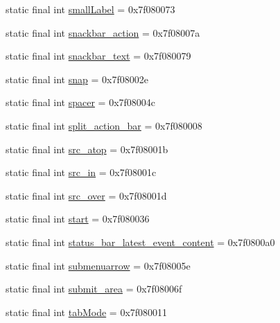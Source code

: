 \begin{CompactItemize}
static final int \hyperlink{classandroid_1_1support_1_1v7_1_1recyclerview_1_1_r_1_1id_5b68944cbbbb99897b27204bfdae8312}{smallLabel} = 0x7f080073
\item 
static final int \hyperlink{classandroid_1_1support_1_1v7_1_1recyclerview_1_1_r_1_1id_1795eacf7b79166ea8f7920e7458a59d}{snackbar\_\-action} = 0x7f08007a
\item 
static final int \hyperlink{classandroid_1_1support_1_1v7_1_1recyclerview_1_1_r_1_1id_b867545d3c71b127e8a68a0974a41d9f}{snackbar\_\-text} = 0x7f080079
\item 
static final int \hyperlink{classandroid_1_1support_1_1v7_1_1recyclerview_1_1_r_1_1id_988340680aebcf90a5486cfcf55a210f}{snap} = 0x7f08002e
\item 
static final int \hyperlink{classandroid_1_1support_1_1v7_1_1recyclerview_1_1_r_1_1id_800f0ac17a6874da8f870f934699b2d8}{spacer} = 0x7f08004c
\item 
static final int \hyperlink{classandroid_1_1support_1_1v7_1_1recyclerview_1_1_r_1_1id_e259a1c9d0c833406c31802167ec9531}{split\_\-action\_\-bar} = 0x7f080008
\item 
static final int \hyperlink{classandroid_1_1support_1_1v7_1_1recyclerview_1_1_r_1_1id_c1bc6650b2db74cfff1d2bd9de7962c9}{src\_\-atop} = 0x7f08001b
\item 
static final int \hyperlink{classandroid_1_1support_1_1v7_1_1recyclerview_1_1_r_1_1id_e1f949a41faa276bd2c448531964d0d2}{src\_\-in} = 0x7f08001c
\item 
static final int \hyperlink{classandroid_1_1support_1_1v7_1_1recyclerview_1_1_r_1_1id_4a3780682c582a797c1b3cafed345233}{src\_\-over} = 0x7f08001d
\item 
static final int \hyperlink{classandroid_1_1support_1_1v7_1_1recyclerview_1_1_r_1_1id_30cd3f71322c010dc679a0cabc04ff18}{start} = 0x7f080036
\item 
static final int \hyperlink{classandroid_1_1support_1_1v7_1_1recyclerview_1_1_r_1_1id_b0f056de4e4f6b07ccb475868499e2f1}{status\_\-bar\_\-latest\_\-event\_\-content} = 0x7f0800a0
\item 
static final int \hyperlink{classandroid_1_1support_1_1v7_1_1recyclerview_1_1_r_1_1id_3180dd66cc765f13fde9ed23ca23fdfb}{submenuarrow} = 0x7f08005e
\item 
static final int \hyperlink{classandroid_1_1support_1_1v7_1_1recyclerview_1_1_r_1_1id_2610259a07f32e859ee2c3fd4c87679f}{submit\_\-area} = 0x7f08006f
\item 
static final int \hyperlink{classandroid_1_1support_1_1v7_1_1recyclerview_1_1_r_1_1id_962d48dccada5bd1b179925d39827b30}{tabMode} = 0x7f080011

\end{CompactItemize}
